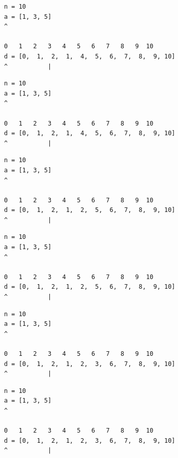 \begin{frame}[fragile]
\begin{verbatim}
n = 10
a = [1, 3, 5]
^

0   1   2   3   4   5   6   7   8   9  10
d = [0,  1,  2,  1,  4,  5,  6,  7,  8,  9, 10]
^           |
\end{verbatim}
\end{frame}
\addtocounter{framenumber}{-1}

\begin{frame}[fragile]
\begin{verbatim}
n = 10
a = [1, 3, 5]
^

0   1   2   3   4   5   6   7   8   9  10
d = [0,  1,  2,  1,  4,  5,  6,  7,  8,  9, 10]
^           |
\end{verbatim}
\end{frame}
\addtocounter{framenumber}{-1}

\begin{frame}[fragile]
\begin{verbatim}
n = 10
a = [1, 3, 5]
^

0   1   2   3   4   5   6   7   8   9  10
d = [0,  1,  2,  1,  2,  5,  6,  7,  8,  9, 10]
^           |
\end{verbatim}
\end{frame}
\addtocounter{framenumber}{-1}

\begin{frame}[fragile]
\begin{verbatim}
n = 10
a = [1, 3, 5]
^

0   1   2   3   4   5   6   7   8   9  10
d = [0,  1,  2,  1,  2,  5,  6,  7,  8,  9, 10]
^           |
\end{verbatim}
\end{frame}
\addtocounter{framenumber}{-1}

\begin{frame}[fragile]
\begin{verbatim}
n = 10
a = [1, 3, 5]
^

0   1   2   3   4   5   6   7   8   9  10
d = [0,  1,  2,  1,  2,  3,  6,  7,  8,  9, 10]
^           |
\end{verbatim}
\end{frame}
\addtocounter{framenumber}{-1}

\begin{frame}[fragile]
\begin{verbatim}
n = 10
a = [1, 3, 5]
^

0   1   2   3   4   5   6   7   8   9  10
d = [0,  1,  2,  1,  2,  3,  6,  7,  8,  9, 10]
^           |
\end{verbatim}
\end{frame}
\addtocounter{framenumber}{-1}

